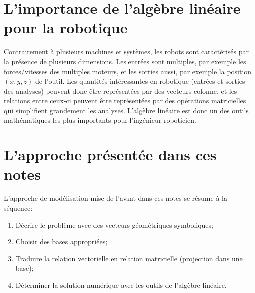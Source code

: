 

\section{L'importance de l'algèbre linéaire pour la robotique}

Contrairement à plusieurs machines et systèmes, les robots sont caractérisés par la présence de plusieurs dimensions. Les entrées sont multiples, par exemple les forces/vitesses des multiples moteurs, et les sorties aussi, par exemple la position $(x,y,z)$ de l'outil. Les quantités intéressantes en robotique (entrées et sorties des analyses) peuvent donc être représentées par des vecteurs-colonne, et les relations entre ceux-ci peuvent être représentées par des opérations matricielles qui simplifient grandement les analyses. L'algèbre linéaire est donc un des outils mathématiques les plus importants pour l'ingénieur roboticien.


\newpage
\section{L'approche présentée dans ces notes}

L'approche de modélisation mise de l'avant dans ces notes se résume à la séquence:
\begin{enumerate}
	\item Décrire le problème avec des vecteurs géométriques symboliques;
	\item Choisir des bases appropriées;
	\item Traduire la relation vectorielle en relation matricielle (projection dans une base);
	\item Déterminer la solution numérique avec les outils de l'algèbre linéaire.
\end{enumerate}

